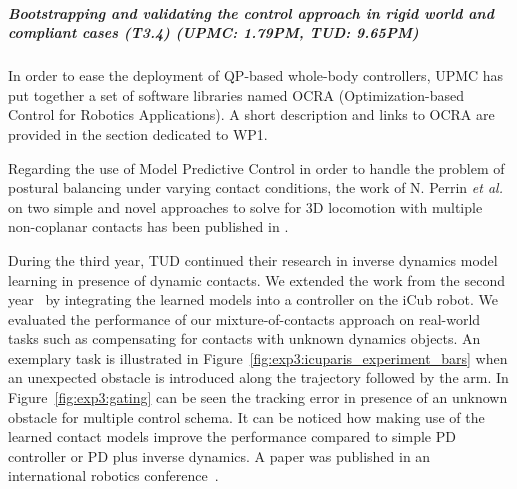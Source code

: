  
\subparagraph{Bootstrapping and validating the control approach in rigid world and compliant cases (T3.4) (UPMC: 1.79PM, TUD: 9.65PM)}
 
In order to ease the deployment of QP-based whole-body controllers, UPMC has put together a set of software libraries named OCRA (Optimization-based Control for Robotics Applications). A short description and links to OCRA are provided in the section dedicated to WP1.

Regarding the use of Model Predictive Control in order to handle the problem of postural balancing under varying contact conditions, the work of N. Perrin \textit{et al.} on two simple and novel approaches to solve for 3D locomotion with multiple non-coplanar contacts has been published in \cite{perrin_ISRR2015}.

During the third year, TUD continued their research in inverse dynamics model learning in presence of dynamic contacts. 
We extended the work from the second year~\cite{Calandra_ICRA15} by integrating the learned models into a controller on the iCub robot.
We evaluated the performance of our mixture-of-contacts approach on real-world tasks such as compensating for contacts with unknown dynamics objects.
An exemplary task is illustrated in Figure~\ref{fig:exp3:icuparis_experiment_bars} when an unexpected obstacle is introduced along the trajectory followed by the arm.
In Figure~\ref{fig:exp3:gating} can be seen the tracking error in presence of an unknown obstacle for multiple control schema. 
It can be noticed how making use of the learned contact models improve the performance compared to simple PD controller or PD plus inverse dynamics.
A paper was published in an international robotics conference~\cite{calandra2015learning}.


